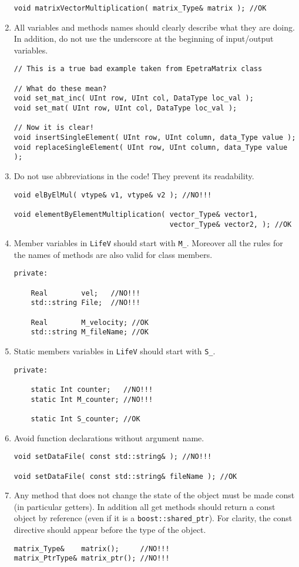 \documentclass[10p]{article}
\begin{document}
\begin{enumerate}
\begin{lstlisting}
void matrixVectorMultiplication( matrix_Type& matrix ); //OK
\end{lstlisting}
  \item All variables and methods names should clearly describe what they are doing. In addition, do not use the underscore at the beginning of input/output variables.
\begin{lstlisting}
// This is a true bad example taken from EpetraMatrix class

// What do these mean?
void set_mat_inc( UInt row, UInt col, DataType loc_val );
void set_mat( UInt row, UInt col, DataType loc_val );

// Now it is clear!
void insertSingleElement( UInt row, UInt column, data_Type value );
void replaceSingleElement( UInt row, UInt column, data_Type value );

  \end{lstlisting}
  \item Do not use abbreviations in the code! They prevent its readability.
\begin{lstlisting}
void elByElMul( vtype& v1, vtype& v2 ); //NO!!!

void elementByElementMultiplication( vector_Type& vector1,
                                     vector_Type& vector2, ); //OK
\end{lstlisting}
  \item Member variables in \texttt{LifeV} should start with \texttt{M\_}. Moreover all the rules for the names of methods are also valid for class members.
\begin{lstlisting}
private:

    Real        vel;   //NO!!!
    std::string File;  //NO!!!

    Real        M_velocity; //OK
    std::string M_fileName; //OK
\end{lstlisting}
  \item Static members variables in \texttt{LifeV} should start with \texttt{S\_}.
\begin{lstlisting}
private:

    static Int counter;   //NO!!!
    static Int M_counter; //NO!!!

    static Int S_counter; //OK
\end{lstlisting}
  \item Avoid function declarations without argument name.
\begin{lstlisting}
void setDataFile( const std::string& ); //NO!!!

void setDataFile( const std::string& fileName ); //OK
\end{lstlisting}
  \item Any method that does not change the state of the object must be made const (in particular getters). In addition all get methods should return a const object by reference (even if it is a \texttt{boost::shared\_ptr}). For clarity, the const directive should appear before the type of the object.
\begin{lstlisting}
matrix_Type&    matrix();     //NO!!!
matrix_PtrType& matrix_ptr(); //NO!!!


\end{lstlisting}
\end{enumerate}
\end{document}
